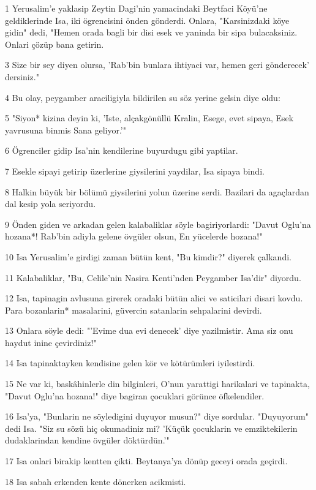 \par 1 Yerusalim'e yaklasip Zeytin Dagi'nin yamacindaki Beytfaci Köyü'ne geldiklerinde Isa, iki ögrencisini önden gönderdi. Onlara, "Karsinizdaki köye gidin" dedi, "Hemen orada bagli bir disi esek ve yaninda bir sipa bulacaksiniz. Onlari çözüp bana getirin.
\par 3 Size bir sey diyen olursa, 'Rab'bin bunlara ihtiyaci var, hemen geri gönderecek' dersiniz."
\par 4 Bu olay, peygamber araciligiyla bildirilen su söz yerine gelsin diye oldu:
\par 5 "Siyon* kizina deyin ki, 'Iste, alçakgönüllü Kralin, Esege, evet sipaya, Esek yavrusuna binmis Sana geliyor.'"
\par 6 Ögrenciler gidip Isa'nin kendilerine buyurdugu gibi yaptilar.
\par 7 Esekle sipayi getirip üzerlerine giysilerini yaydilar, Isa sipaya bindi.
\par 8 Halkin büyük bir bölümü giysilerini yolun üzerine serdi. Bazilari da agaçlardan dal kesip yola seriyordu.
\par 9 Önden giden ve arkadan gelen kalabaliklar söyle bagiriyorlardi: "Davut Oglu'na hozana*! Rab'bin adiyla gelene övgüler olsun, En yücelerde hozana!"
\par 10 Isa Yerusalim'e girdigi zaman bütün kent, "Bu kimdir?" diyerek çalkandi.
\par 11 Kalabaliklar, "Bu, Celile'nin Nasira Kenti'nden Peygamber Isa'dir" diyordu.
\par 12 Isa, tapinagin avlusuna girerek oradaki bütün alici ve saticilari disari kovdu. Para bozanlarin* masalarini, güvercin satanlarin sehpalarini devirdi.
\par 13 Onlara söyle dedi: "'Evime dua evi denecek' diye yazilmistir. Ama siz onu haydut inine çevirdiniz!"
\par 14 Isa tapinaktayken kendisine gelen kör ve kötürümleri iyilestirdi.
\par 15 Ne var ki, baskâhinlerle din bilginleri, O'nun yarattigi harikalari ve tapinakta, "Davut Oglu'na hozana!" diye bagiran çocuklari görünce öfkelendiler.
\par 16 Isa'ya, "Bunlarin ne söyledigini duyuyor musun?" diye sordular. "Duyuyorum" dedi Isa. "Siz su sözü hiç okumadiniz mi? 'Küçük çocuklarin ve emziktekilerin dudaklarindan kendine övgüler döktürdün.'"
\par 17 Isa onlari birakip kentten çikti. Beytanya'ya dönüp geceyi orada geçirdi.
\par 18 Isa sabah erkenden kente dönerken acikmisti.

